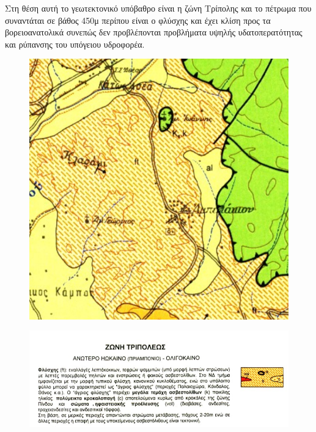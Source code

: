 \documentclass[12pt]{article}
\begin{document}
 	Στη θέση αυτή το γεωτεκτονικό υπόβαθρο είναι η ζώνη Τρίπολης και το πέτρωμα που συναντάται σε βάθος 450μ περίπου είναι ο φλύσχης και έχει κλίση προς τα βορειοανατολικά συνεπώς δεν προβλέπονται προβλήματα υψηλής υδατοπερατότητας και ρύπανσης του υπόγειου υδροφορέα.
 	
 	\begin{figure} [H]
 		\begin{center}
 			\includegraphics [scale = 0.50] {map34.png}
 		\end{center}
 	\end{figure}
 
 	\begin{figure} [H]
 		\begin{center}
 			\includegraphics [scale = 0.50] {explain3.png}
 		\end{center}
 	\end{figure}
 
\end{document}
